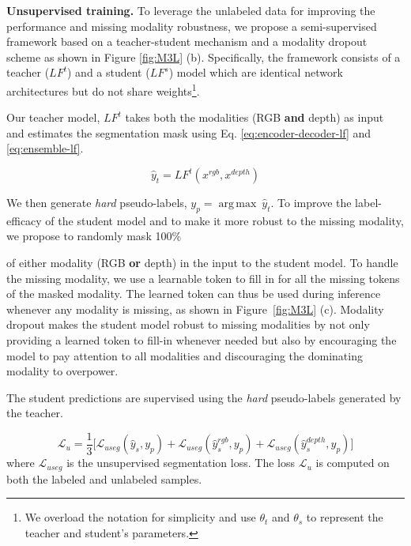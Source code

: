 \documentclass[10pt,twocolumn,letterpaper]{article}
\DeclareMathOperator*{\argmax}{arg\,max}
\begin{document}
\noindent\textbf{Unsupervised training.} To leverage the unlabeled data for improving the performance and missing modality robustness, we propose a semi-supervised framework based on a teacher-student mechanism \cite{mt} and a modality dropout scheme as shown in Figure \ref{fig:M3L} (b). Specifically, the framework consists of a teacher ($LF^t$) and a student ($LF^s$) model which are identical network architectures but do not share weights\footnote{We overload the notation for simplicity and use $\theta_t$ and $\theta_s$ to represent the teacher and student's parameters.}.

Our teacher model, $LF^t$ takes both the modalities (RGB \textbf{and} depth) as input and estimates the segmentation mask using Eq. \ref{eq:encoder-decoder-lf} and \ref{eq:ensemble-lf}.

\begin{equation}
    \hat{y}_t = LF^t(x^{rgb}, x^{depth})
    \label{eq:M3L-teacher-pred}
\end{equation}

We then generate \emph{hard} pseudo-labels, $y_{p} = \argmax ~\hat{y}_t$. To improve the label-efficacy of the student model and to make it more robust to the missing modality, we propose to randomly mask 100\% 

of either modality (RGB \textbf{or} depth) in the input to the student model. 
To handle the missing modality, we use a learnable token to fill in for all the missing tokens of the masked modality.
The learned token can thus be used during inference whenever any modality is missing, as shown in Figure~\ref{fig:M3L} (c).
Modality dropout makes the student model robust to missing modalities by not only providing a learned token to fill-in whenever needed but also by encouraging the model to pay attention to all modalities and discouraging the dominating modality to overpower.

The student predictions are supervised using the \emph{hard} pseudo-labels generated by the teacher.

\small{
\begin{equation}
    \mathcal{L}_u = \frac{1}{3}\Big[\mathcal{L}_{useg}(\hat{y}_{s}, y_{p}) + \mathcal{L}_{useg}(\hat{y}_s^{rgb}, y_{p}) + \mathcal{L}_{useg}(\hat{y}_s^{depth}, y_{p})\Big]
    \label{eq:M3L-unsup-loss}
\end{equation}
}
where $\mathcal{L}_{useg}$ is the unsupervised segmentation loss. The loss $\mathcal{L}_u $ is computed on both the labeled and unlabeled samples.
\end{document}
